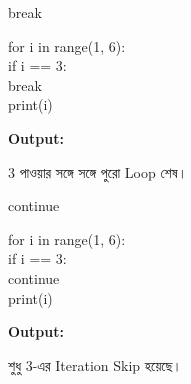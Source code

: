 \begin{codeoutputbox}{\textenglish{\ttfamily break}}

\noindent
\begin{minipage}[t]{0.53\linewidth}
\codeheading

\begin{english}
\ttfamily
for i in range(1, 6):\\
\hspace*{4mm}if i == 3:\\
\hspace*{8mm}break\\
\hspace*{4mm}print(i)
\end{english}

\end{minipage}
\hfill
\begin{minipage}[t]{0.43\linewidth}
\outputheading

\textbf{Output:}
\textenglish{ }

\medskip

3 পাওয়ার সঙ্গে সঙ্গে পুরো Loop শেষ।

\end{minipage}

\end{codeoutputbox}

\begin{codeoutputbox}{\textenglish{\ttfamily continue}}

\noindent
\begin{minipage}[t]{0.53\linewidth}
\codeheading

\begin{english}
\ttfamily
for i in range(1, 6):\\
\hspace*{4mm}if i == 3:\\
\hspace*{8mm}continue\\
\hspace*{4mm}print(i)
\end{english}

\end{minipage}
\hfill
\begin{minipage}[t]{0.43\linewidth}
\outputheading

\textbf{Output:}
\textenglish{   }

\medskip

শুধু 3-এর Iteration Skip হয়েছে।

\end{minipage}

\end{codeoutputbox}

